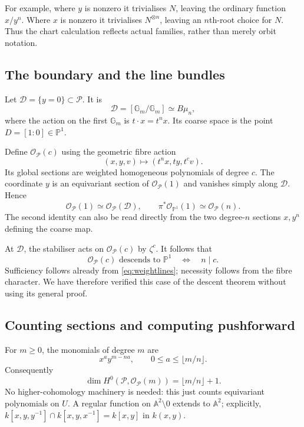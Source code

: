 \documentclass[11pt,a4paper]{article}
\numberwithin{equation}{section}
\theoremstyle{definition}
\newcommand{\A}{\mathbb A}
\newcommand{\PP}{\mathbb P}
\newcommand{\Gm}{\mathbb G_m}
\newcommand{\OO}{\mathcal O}
\newcommand{\cD}{\mathcal D}
\newcommand{\cP}{\mathcal P}
\begin{document}
For example, where $y$ is nonzero it trivialises $N$, leaving the ordinary
function $x/y^n$. Where $x$ is nonzero it trivialises $N^{\otimes n}$,
leaving an $n$th-root choice for $N$. Thus the chart calculation reflects
actual families, rather than merely orbit notation.

\subsection{The boundary and the line bundles}
Let $\cD=\{y=0\}\subset\cP$. It is
\[
 \cD=[\Gm/\Gm]\simeq B\mu_n,
\]
where the action on the first $\Gm$ is $t\cdot x=t^n x$. Its coarse space
is the point $D=[1:0]\in\PP^1$.

Define $\OO_{\cP}(c)$ using the geometric fibre action
\[
 (x,y,v)\longmapsto(t^n x,ty,t^c v).
\]
Its global sections are weighted homogeneous polynomials of degree $c$.
The coordinate $y$ is an equivariant section of $\OO_{\cP}(1)$ and vanishes
simply along $\cD$. Hence
\begin{equation}\label{eq:weightlines}
 \OO_{\cP}(1)\simeq\OO_{\cP}(\cD),\qquad
 \pi^*\OO_{\PP^1}(1)\simeq\OO_{\cP}(n).
\end{equation}
The second identity can also be read directly from the two degree-$n$
sections $x,y^n$ defining the coarse map.

At $\cD$, the stabiliser acts on $\OO_{\cP}(c)$ by $\zeta^c$.
It follows that
\begin{equation}\label{eq:weighteddescent}
 \OO_{\cP}(c)\text{ descends to }\PP^1
 \quad\Longleftrightarrow\quad n\mid c.
\end{equation}
Sufficiency follows already from \eqref{eq:weightlines}; necessity follows
from the fibre character. We have therefore verified this case of the
descent theorem without using its general proof.

\subsection{Counting sections and computing pushforward}
For $m\ge0$, the monomials of degree $m$ are
\[
 x^a y^{m-na},\qquad 0\leq a\leq\lfloor m/n\rfloor.
\]
Consequently
\begin{equation}\label{eq:weightedh0}
 \dim H^0(\cP,\OO_{\cP}(m))=\lfloor m/n\rfloor+1.
\end{equation}
No higher-cohomology machinery is needed: this just counts equivariant
polynomials on $U$. A regular function on $\A^2\setminus0$ extends to
$\A^2$; explicitly, $k[x,y,y^{-1}]\cap k[x,y,x^{-1}]=k[x,y]$ in $k(x,y)$.
\end{document}
